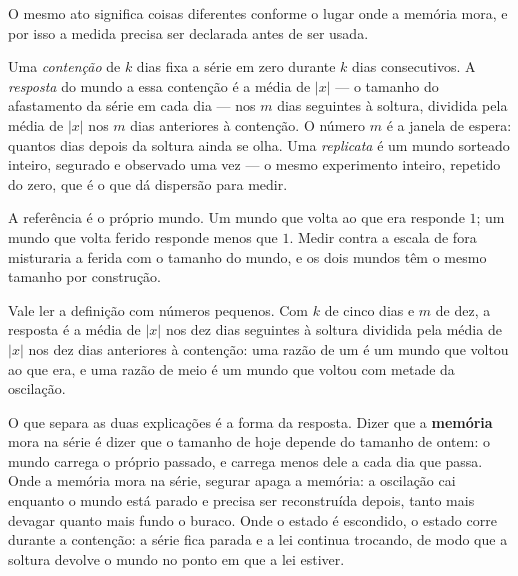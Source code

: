 O mesmo ato significa coisas diferentes conforme o lugar onde a memória mora, e por isso a medida
precisa ser declarada antes de ser usada.

\begin{definicao}\label{def:resposta}
Uma \emph{contenção} de $k$ dias fixa a série em zero durante $k$ dias consecutivos. A
\emph{resposta} do mundo a essa contenção é a média de $|x|$ --- o tamanho do afastamento da série em
cada dia --- nos $m$ dias seguintes à soltura,
dividida pela média de $|x|$ nos $m$ dias anteriores à contenção. O número $m$ é a janela de
espera: quantos dias depois da soltura ainda se olha. Uma \emph{replicata} é um mundo
sorteado inteiro, segurado e observado uma vez --- o mesmo experimento inteiro, repetido do
zero, que é o que dá dispersão para medir.
\end{definicao}

A referência é o próprio mundo. Um mundo que volta ao que era responde $1$; um mundo que volta
ferido responde menos que $1$. Medir contra a escala de fora misturaria a ferida com o tamanho do
mundo, e os dois mundos têm o mesmo tamanho por construção.

Vale ler a definição com números pequenos. Com $k$ de cinco dias e $m$ de dez, a resposta é a média
de $|x|$ nos dez dias seguintes à soltura dividida pela média de $|x|$ nos dez dias anteriores à
contenção: uma razão de um é um mundo que voltou ao que era, e uma razão de meio é um mundo que
voltou com metade da oscilação.

O que separa as duas explicações é a forma da resposta.
Dizer que a \textbf{memória} mora na série é
dizer que o tamanho de hoje depende do tamanho de ontem: o mundo carrega o próprio passado, e
carrega menos dele a cada dia que passa. Onde a memória mora na série, segurar apaga
a memória: a oscilação cai enquanto o mundo está parado e precisa ser reconstruída depois, tanto
mais devagar quanto mais fundo o buraco. Onde o estado é escondido, o estado corre durante a
contenção: a série fica parada e a lei continua trocando, de modo que a soltura devolve o mundo no
ponto em que a lei estiver.

